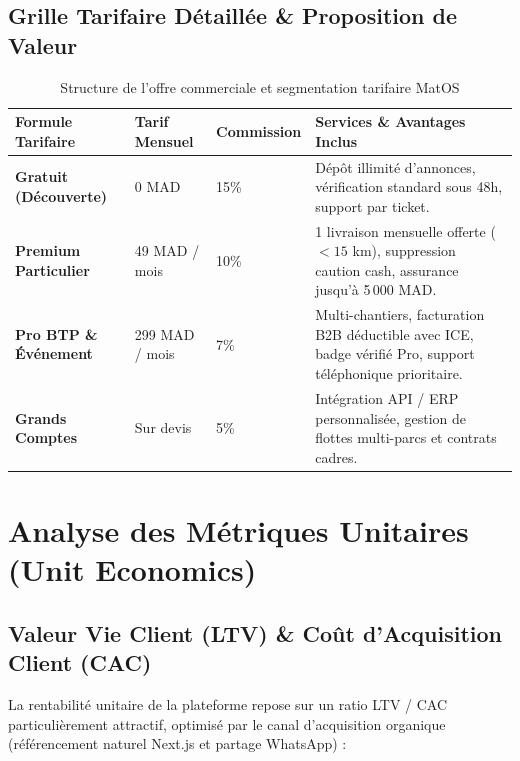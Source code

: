 \documentclass[11pt,a4paper]{report}
\begin{document}
\section{Grille Tarifaire Détaillée \& Proposition de Valeur}
\begin{table}[h!]
\centering
\small
\begin{tabularx}{\textwidth}{p{3.5cm} p{2.2cm} p{2.2cm} X}
\toprule
\textbf{Formule Tarifaire} & \textbf{Tarif Mensuel} & \textbf{Commission} & \textbf{Services \& Avantages Inclus} \\
\midrule
\textbf{Gratuit (Découverte)} & 0 MAD & 15\% & Dépôt illimité d'annonces, vérification standard sous 48h, support par ticket. \\
\addlinespace
\textbf{Premium Particulier} & 49 MAD / mois & 10\% & 1 livraison mensuelle offerte ($<15$ km), suppression caution cash, assurance jusqu'à 5\,000 MAD. \\
\addlinespace
\textbf{Pro BTP \& Événement} & 299 MAD / mois & 7\% & Multi-chantiers, facturation B2B déductible avec ICE, badge vérifié Pro, support téléphonique prioritaire. \\
\addlinespace
\textbf{Grands Comptes} & Sur devis & 5\% & Intégration API / ERP personnalisée, gestion de flottes multi-parcs et contrats cadres. \\
\bottomrule
\end{tabularx}
\caption{Structure de l'offre commerciale et segmentation tarifaire MatOS}
\end{table}

\chapter{Analyse des Métriques Unitaires (Unit Economics)}

\section{Valeur Vie Client (LTV) \& Coût d'Acquisition Client (CAC)}
La rentabilité unitaire de la plateforme repose sur un ratio LTV / CAC particulièrement attractif, optimisé par le canal d'acquisition organique (référencement naturel Next.js et partage WhatsApp) :
\end{document}
